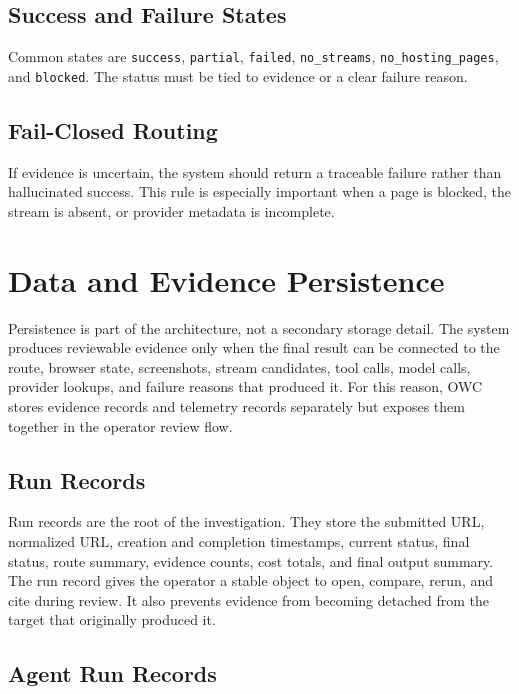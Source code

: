 \subsection{Success and Failure States}

Common states are \texttt{success}, \texttt{partial}, \texttt{failed},
\texttt{no\_streams}, \texttt{no\_hosting\_\allowbreak pages}, and
\texttt{blocked}. The status must be tied to evidence or a clear failure
reason.

\subsection{Fail-Closed Routing}

If evidence is uncertain, the system should return a traceable failure rather
than hallucinated success. This rule is especially important when a page is
blocked, the stream is absent, or provider metadata is incomplete.

\section{Data and Evidence Persistence}

Persistence is part of the architecture, not a secondary storage detail. The
system produces reviewable evidence only when the final result can be connected
to the route, browser state, screenshots, stream candidates, tool calls, model
calls, provider lookups, and failure reasons that produced it. For this reason,
OWC stores evidence records and telemetry records separately but exposes them
together in the operator review flow.





\subsection{Run Records}

Run records are the root of the investigation. They store the submitted URL,
normalized URL, creation and completion timestamps, current status, final
status, route summary, evidence counts, cost totals, and final output summary.
The run record gives the operator a stable object to open, compare, rerun, and
cite during review. It also prevents evidence from becoming detached from the
target that originally produced it.

\subsection{Agent Run Records}

